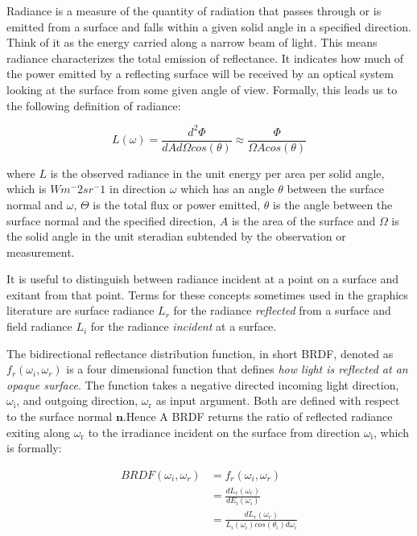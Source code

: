 Radiance is a measure of the quantity of radiation that passes through or is emitted from a surface and falls within a given solid angle in a specified direction. Think of it as the energy carried along a narrow beam of light. 
This means radiance characterizes the total emission of reflectance. It indicates how much of the power emitted by a reflecting surface will be received by an optical system looking at the surface from some given angle of view. Formally, this leads us to the following definition of radiance: 

\begin{equation}
 L(\omega) = \frac{d^2 \Phi}{dA d\Omega cos(\theta)} \approx \frac{\Phi}{\Omega A cos(\theta)}
\end{equation}

where $L$ is the observed radiance in the unit energy per area per solid angle, which is $Wm^-2 sr^-1$ in direction $\omega$ which has an angle $\theta$ between the surface normal and $\omega$, $\Theta$ is the total flux or power emitted, $\theta$ is the angle between the surface normal and the specified direction, $A$ is the area of the surface and $\Omega$ is the solid angle in the unit steradian subtended by the observation or measurement.

It is useful to distinguish between radiance incident at a point on a surface and exitant from that point. Terms for these concepts sometimes used in the graphics literature are surface radiance $L_r$ for the radiance \textit{reflected} from a surface and field radiance $L_i$ for the radiance \textit{incident} at a surface.  

The bidirectional reflectance distribution function, in short BRDF, denoted as $f_r(\omega_i, \omega_r)$ is a four dimensional function that defines \textit{how light is reflected at an opaque surface}. The function takes a negative directed incoming light direction, $\omega_{\text{i}}$, and outgoing direction, $\omega_{\text{r}}$ as input argument. Both are defined with respect to the surface normal $\mathbf{n}$.Hence A BRDF returns the ratio of reflected radiance exiting along $\omega_{\text{r}}$ to the irradiance incident on the surface from direction $\omega_{\text{i}}$, which is formally:
  
\begin{align}
  BRDF(\omega_i, \omega_r)
  & = f_r(\omega_i, \omega_r) \\
  & = \frac{dL_r(\omega_r)}{dE_i(\omega_i)} \\
  & = \frac{dL_r(\omega_r)}{L_i(\omega_i)cos(\theta_i)d\omega_i}
\end{align}


